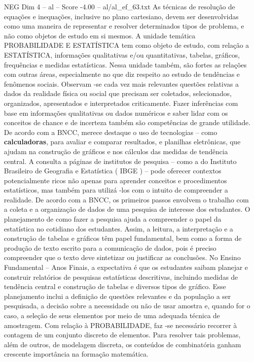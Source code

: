 \begin{textsample}{NEG Dim 4 – al – Score -4.00 – al/al\_ef\_63.txt}
As técnicas de resolução de equações e inequações, inclusive no plano cartesiano, devem ser desenvolvidas como uma maneira de representar e resolver determinados tipos de problema, e não como objetos de estudo em si mesmos.
A unidade temática PROBABILIDADE E ESTATÍSTICA tem como objeto de estudo, com relação a ESTATÍSTICA, informações qualitativas e/ou quantitativas, tabelas, gráficos, frequências e medidas estatísticas.
Nessa unidade também, são fortes as relações com outras áreas, especialmente no que diz respeito ao estudo de tendências e fenômenos sociais.
Observam -se cada vez mais relevantes questões relativas a dados da realidade física ou social que precisam ser coletados, selecionados, organizados, apresentados e interpretados criticamente.
Fazer inferências com base em informações qualitativas ou dados numéricos e saber lidar com os conceitos de chance e de incerteza também são competências de grande utilidade.
De acordo com a BNCC, merece destaque o uso de tecnologias – como \textbf{calculadoras}, para avaliar e comparar resultados, e planilhas eletrônicas, que ajudam na construção de gráficos e nos cálculos das medidas de tendência central.
A consulta a páginas de institutos de pesquisa – como a do Instituto Brasileiro de Geografia e Estatística ( IBGE ) – pode oferecer contextos potencialmente ricos não apenas para aprender conceitos e procedimentos estatísticos, mas também para utilizá -los com o intuito de compreender a realidade.
De acordo com a BNCC, os primeiros passos envolvem o trabalho com a coleta e a organização de dados de uma pesquisa de interesse dos estudantes.
O planejamento de como fazer a pesquisa ajuda a compreender o papel da estatística no cotidiano dos estudantes.
Assim, a leitura, a interpretação e a construção de tabelas e gráficos têm papel fundamental, bem como a forma de produção de texto escrito para a comunicação de dados, pois é preciso compreender que o texto deve sintetizar ou justificar as conclusões.
No Ensino Fundamental – Anos Finais, a expectativa é que os estudantes saibam planejar e construir relatórios de pesquisas estatísticas descritivas, incluindo medidas de tendência central e construção de tabelas e diversos tipos de gráfico.
Esse planejamento inclui a definição de questões relevantes e da população a ser pesquisada, a decisão sobre a necessidade ou não de usar amostra e, quando for o caso, a seleção de seus elementos por meio de uma adequada técnica de amostragem.
Com relação à PROBABILIDADE, faz -se necessário recorrer à contagem de um conjunto discreto de elementos.
Para resolver tais problemas, além de outros, de modelagem discreta, os conteúdos de combinatória ganham crescente importância na formação matemática.

\end{textsample}
